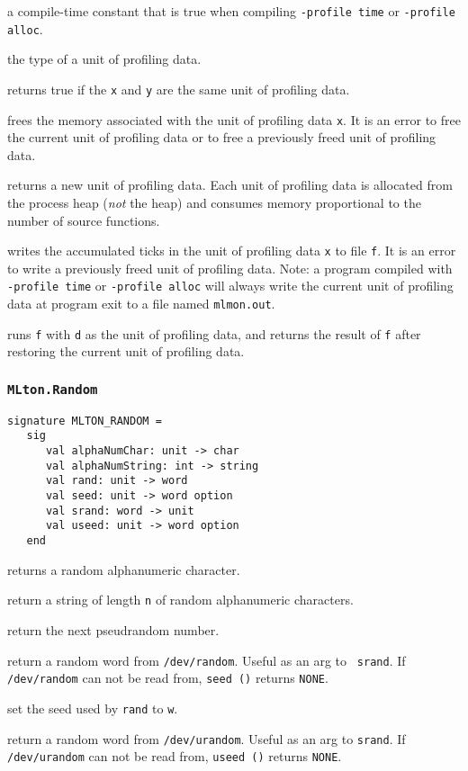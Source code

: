 \begin{description}

a compile-time constant that is true when compiling {\tt -profile
time} or {\tt -profile alloc}.

 the type of a unit of profiling data.

returns true if the {\tt x} and {\tt y} are the same unit of profiling
data.

frees the memory associated with the unit of profiling data {\tt x}.
It is an error to free the current unit of profiling data or to free a
previously freed unit of profiling data.

returns a new unit of profiling data.  Each unit of profiling data is
allocated from the process heap (\emph{not} the {\mlton} heap) and
consumes memory proportional to the number of source functions.

writes the accumulated ticks in the unit of profiling data {\tt x} to
file {\tt f}.  It is an error to write a previously freed unit of
profiling data.  Note: a program compiled with {\tt -profile time} or
{\tt -profile alloc} will always write the current unit of profiling
data at program exit to a file named {\tt mlmon.out}.

runs {\tt f} with {\tt d} as the unit of profiling data, and returns
the result of {\tt f} after restoring the current unit of profiling
data.

\end{description}
%
\subsubsection{\tt MLton.Random}

\begin{verbatim}
signature MLTON_RANDOM =
   sig
      val alphaNumChar: unit -> char
      val alphaNumString: int -> string
      val rand: unit -> word
      val seed: unit -> word option
      val srand: word -> unit
      val useed: unit -> word option
   end
\end{verbatim}

\begin{description}
returns a random alphanumeric character.

return a string of length {\tt n} of random alphanumeric characters.

return the next pseudrandom number.

return a random word from {\tt /dev/random}.  Useful as an arg to {\tt
srand}.  If {\tt /dev/random} can not be read from, {\tt seed ()}
returns {\tt NONE}.

set the seed used by {\tt rand} to {\tt w}.

return a random word from {\tt /dev/urandom}.  Useful as an arg to
{\tt srand}.  If {\tt /dev/urandom} can not be read from, {\tt useed
()} returns {\tt NONE}.

\end{description}
%
